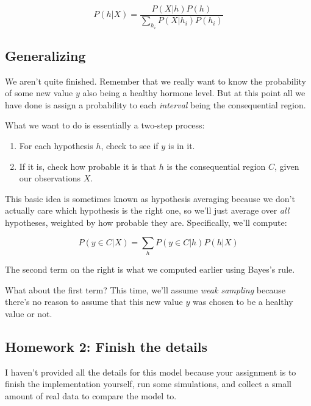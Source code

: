 \documentclass[
  letterpaper,
  DIV=11,
  numbers=noendperiod]{scrreprt}
\makeatletter
\newcommand*\pandocbounded[1]{%
  \sbox\pandoc@box{#1}%
  \Gscale@div\@tempa{\textheight}{\dimexpr\ht\pandoc@box+\dp\pandoc@box\relax}%
  \Gscale@div\@tempb{\linewidth}{\wd\pandoc@box}%
  \ifdim\@tempb\p@<\@tempa\p@\let\@tempa\@tempb\fi%
  \ifdim\@tempa\p@<\p@\scalebox{\@tempa}{\usebox\pandoc@box}%
  \else\usebox{\pandoc@box}%
  \fi%
}
\providecommand{\tightlist}{%
  \setlength{\itemsep}{0pt}\setlength{\parskip}{0pt}}
\makeatother
\begin{document}
\[
P(h|X) = \frac{P(X|h) P(h)}{\sum_{h_i} P(X|h_i) P(h_i)}
\]

\subsection{Generalizing}\label{generalizing}

We aren't quite finished. Remember that we really want to know the
probability of some new value \(y\) also being a healthy hormone level.
But at this point all we have done is assign a probability to each
\emph{interval} being the consequential region.

What we want to do is essentially a two-step process:

\begin{enumerate}
\def\labelenumi{\arabic{enumi}.}
\tightlist
\item
  For each hypothesis \(h\), check to see if \(y\) is in it.
\item
  If it is, check how probable it is that \(h\) is the consequential
  region \(C\), given our observations \(X\).
\end{enumerate}

This basic idea is sometimes known as hypothesis averaging because we
don't actually care which hypothesis is the right one, so we'll just
average over \emph{all} hypotheses, weighted by how probable they are.
Specifically, we'll compute:

\[
P(y \in C|X) = \sum_h P(y \in C | h) P(h | X)
\]

The second term on the right is what we computed earlier using Bayes's
rule.

What about the first term? This time, we'll assume \emph{weak sampling}
because there's no reason to assume that this new value \(y\) was chosen
to be a healthy value or not.

\subsection{Homework 2: Finish the
details}\label{homework-2-finish-the-details}

\href{https://colab.research.google.com/drive/1aqPpMyc-eMyLGpHFl2Fq_NlLiTuHkGky?usp=sharing}{\pandocbounded{}}

I haven't provided all the details for this model because your
assignment is to finish the implementation yourself, run some
simulations, and collect a small amount of real data to compare the
model to.
\end{document}

